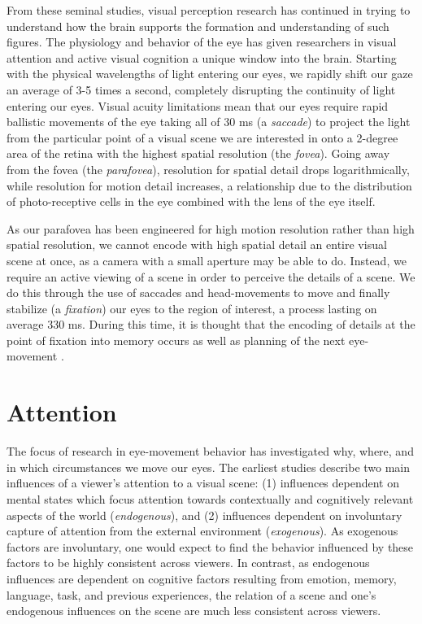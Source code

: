 \documentclass[a4paper,11pt,final]{ThesisStyle}
\begin{document}
From these seminal studies, visual perception research has continued in trying to understand how the brain supports the formation and understanding of such figures.  The physiology and behavior of the eye has given researchers in visual attention and active visual cognition a unique window into the brain.  Starting with the physical wavelengths of light entering our eyes, we rapidly shift our gaze an average of 3-5 times a second, completely disrupting the continuity of light entering our eyes.  Visual acuity limitations mean that our eyes require rapid ballistic movements of the eye taking all of 30 ms (a \textit{saccade}) to project the light from the particular point of a visual scene we are interested in onto a 2-degree area of the retina with the highest spatial resolution (the \textit{fovea}).  Going away from the fovea (the \textit{parafovea}), resolution for spatial detail drops logarithmically, while resolution for motion detail increases, a relationship due to the distribution of photo-receptive cells in the eye combined with the lens of the eye itself.  

As our parafovea has been engineered for high motion resolution rather than high spatial resolution, we cannot encode with high spatial detail an entire visual scene at once, as a camera with a small aperture may be able to do.  Instead, we require an active viewing of a scene in order to perceive the details of a scene.  We do this through the use of saccades and head-movements to move and finally stabilize (a \textit{fixation}) our eyes to the region of interest, a process lasting on average 330 ms.  During this time, it is thought that the encoding of details at the point of fixation into memory occurs as well as planning of the next eye-movement \cite{}.  

\section{Attention}

The focus of research in eye-movement behavior has investigated why, where, and in which circumstances we move our eyes.  The earliest studies \cite{Buswell1935,Yarbus1967} describe two main influences of a viewer's attention to a visual scene: (1) influences dependent on mental states which focus attention towards contextually and cognitively relevant aspects of the world (\textit{endogenous}), and (2) influences dependent on involuntary capture of attention from the external environment (\textit{exogenous}).  As exogenous factors are involuntary, one would expect to find the behavior influenced by these factors to be highly consistent across viewers.  In contrast, as endogenous influences are dependent on cognitive factors resulting from emotion, memory, language, task, and previous experiences, the relation of a scene and one's endogenous influences on the scene are much less consistent across viewers.  
\end{document}
